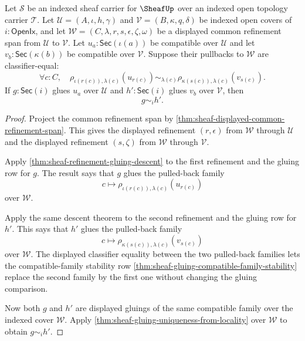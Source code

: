 \begin{theorem}
\label{thm:sheaf-common-refinement-gluing-invariance}
Let $\mathcal{S}$ be an indexed sheaf carrier for $\SheafUp$ over an indexed open topology carrier $\mathcal{T}$. Let $\mathcal{U}=(A,\iota,h,\gamma)$ and $\mathcal{V}=(B,\kappa,q,\delta)$ be indexed open covers of $i:\mathsf{OpenIx}$, and let $\mathcal{W}=(C,\lambda,r,s,\epsilon,\zeta,\omega)$ be a displayed common refinement span from $\mathcal{U}$ to $\mathcal{V}$. Let $u_a:\mathsf{Sec}(\iota(a))$ be compatible over $\mathcal{U}$ and let $v_b:\mathsf{Sec}(\kappa(b))$ be compatible over $\mathcal{V}$. Suppose their pullbacks to $\mathcal{W}$ are classifier-equal:
$$
\forall c:C,\quad
\rho_{\iota(r(c)),\lambda(c)}(u_{r(c)})
\sim_{\lambda(c)}
\rho_{\kappa(s(c)),\lambda(c)}(v_{s(c)}).
$$
If $g:\mathsf{Sec}(i)$ glues $u_a$ over $\mathcal{U}$ and $h':\mathsf{Sec}(i)$ glues $v_b$ over $\mathcal{V}$, then
$$
g\sim_i h'.
$$
\end{theorem}
\begin{proof}
Project the common refinement span by \autoref{thm:sheaf-displayed-common-refinement-span}. This gives the displayed refinement $(r,\epsilon)$ from $\mathcal{W}$ through $\mathcal{U}$ and the displayed refinement $(s,\zeta)$ from $\mathcal{W}$ through $\mathcal{V}$.

Apply \autoref{thm:sheaf-refinement-gluing-descent} to the first refinement and the gluing row for $g$. The result says that $g$ glues the pulled-back family
$$
c\mapsto \rho_{\iota(r(c)),\lambda(c)}(u_{r(c)})
$$
over $\mathcal{W}$.

Apply the same descent theorem to the second refinement and the gluing row for $h'$. This says that $h'$ glues the pulled-back family
$$
c\mapsto \rho_{\kappa(s(c)),\lambda(c)}(v_{s(c)})
$$
over $\mathcal{W}$. The displayed classifier equality between the two pulled-back families lets the compatible-family stability row \autoref{thm:sheaf-gluing-compatible-family-stability} replace the second family by the first one without changing the gluing comparison.

Now both $g$ and $h'$ are displayed gluings of the same compatible family over the indexed cover $\mathcal{W}$. Apply \autoref{thm:sheaf-gluing-uniqueness-from-locality} over $\mathcal{W}$ to obtain $g\sim_i h'$.
\end{proof}

